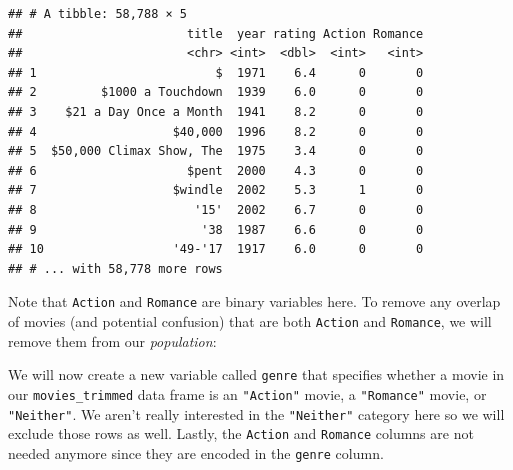 \documentclass[]{tufte-book}
\newenvironment{Shaded}{\begin{snugshade}}{\end{snugshade}}
\newcommand{\KeywordTok}[1]{\textcolor[rgb]{0.13,0.29,0.53}{\textbf{{#1}}}}
\newcommand{\DataTypeTok}[1]{\textcolor[rgb]{0.13,0.29,0.53}{{#1}}}
\newcommand{\DecValTok}[1]{\textcolor[rgb]{0.00,0.00,0.81}{{#1}}}
\newcommand{\StringTok}[1]{\textcolor[rgb]{0.31,0.60,0.02}{{#1}}}
\newcommand{\NormalTok}[1]{{#1}}
\begin{document}
\begin{verbatim}
## # A tibble: 58,788 × 5
##                       title  year rating Action Romance
##                       <chr> <int>  <dbl>  <int>   <int>
## 1                         $  1971    6.4      0       0
## 2         $1000 a Touchdown  1939    6.0      0       0
## 3    $21 a Day Once a Month  1941    8.2      0       0
## 4                   $40,000  1996    8.2      0       0
## 5  $50,000 Climax Show, The  1975    3.4      0       0
## 6                     $pent  2000    4.3      0       0
## 7                   $windle  2002    5.3      1       0
## 8                      '15'  2002    6.7      0       0
## 9                       '38  1987    6.6      0       0
## 10                  '49-'17  1917    6.0      0       0
## # ... with 58,778 more rows
\end{verbatim}

Note that \texttt{Action} and \texttt{Romance} are binary variables
here. To remove any overlap of movies (and potential confusion) that are
both \texttt{Action} and \texttt{Romance}, we will remove them from our
\emph{population}:

\begin{Shaded}
\end{Shaded}

We will now create a new variable called \texttt{genre} that specifies
whether a movie in our \texttt{movies\_trimmed} data frame is an
\texttt{"Action"} movie, a \texttt{"Romance"} movie, or
\texttt{"Neither"}. We aren't really interested in the
\texttt{"Neither"} category here so we will exclude those rows as well.
Lastly, the \texttt{Action} and \texttt{Romance} columns are not needed
anymore since they are encoded in the \texttt{genre} column.

\begin{Shaded}
\end{Shaded}
\end{document}
